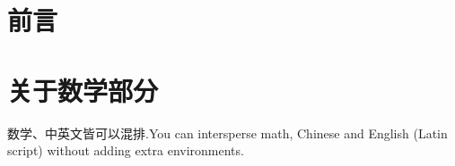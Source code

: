 \documentclass{article}
\begin{document}


%




\section{前言}

\section{关于数学部分}
数学、中英文皆可以混排.You can intersperse math, Chinese and English (Latin script) without adding extra environments.


%
%
%
%
%
%
%
\printglossaries

\end{document}
